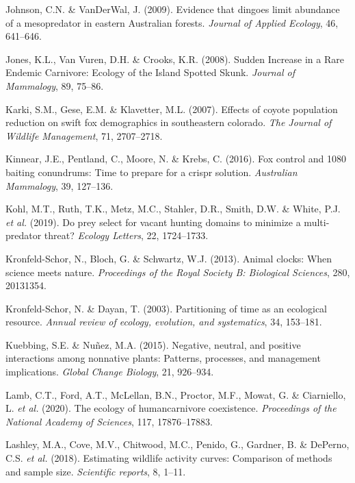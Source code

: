 \documentclass[11pt,a4paper,titlepage,twoside,openright]{style/unimelbthesis}
\begin{document}
\begin{mainmatter}
\leavevmode\hypertarget{ref-johnson2009evidence}{}%
Johnson, C.N. \& VanDerWal, J. (2009). Evidence that dingoes limit abundance of a mesopredator in eastern Australian forests. \emph{Journal of Applied Ecology}, 46, 641--646.

\leavevmode\hypertarget{ref-jones2008sudden}{}%
Jones, K.L., Van Vuren, D.H. \& Crooks, K.R. (2008). Sudden Increase in a Rare Endemic Carnivore: Ecology of the Island Spotted Skunk. \emph{Journal of Mammalogy}, 89, 75--86.

\leavevmode\hypertarget{ref-karki2007effects}{}%
Karki, S.M., Gese, E.M. \& Klavetter, M.L. (2007). Effects of coyote population reduction on swift fox demographics in southeastern colorado. \emph{The Journal of Wildlife Management}, 71, 2707--2718.

\leavevmode\hypertarget{ref-kinnear2016fox}{}%
Kinnear, J.E., Pentland, C., Moore, N. \& Krebs, C. (2016). Fox control and 1080 baiting conundrums: Time to prepare for a crispr solution. \emph{Australian Mammalogy}, 39, 127--136.

\leavevmode\hypertarget{ref-kohl2019prey}{}%
Kohl, M.T., Ruth, T.K., Metz, M.C., Stahler, D.R., Smith, D.W. \& White, P.J. \emph{et al.} (2019). Do prey select for vacant hunting domains to minimize a multi-predator threat? \emph{Ecology Letters}, 22, 1724--1733.

\leavevmode\hypertarget{ref-kronfeld2013animal}{}%
Kronfeld-Schor, N., Bloch, G. \& Schwartz, W.J. (2013). Animal clocks: When science meets nature. \emph{Proceedings of the Royal Society B: Biological Sciences}, 280, 20131354.

\leavevmode\hypertarget{ref-kronfeld2003partitioning}{}%
Kronfeld-Schor, N. \& Dayan, T. (2003). Partitioning of time as an ecological resource. \emph{Annual review of ecology, evolution, and systematics}, 34, 153--181.

\leavevmode\hypertarget{ref-kuebbing2015negative}{}%
Kuebbing, S.E. \& Nuñez, M.A. (2015). Negative, neutral, and positive interactions among nonnative plants: Patterns, processes, and management implications. \emph{Global Change Biology}, 21, 926--934.

\leavevmode\hypertarget{ref-lamb2020ecology}{}%
Lamb, C.T., Ford, A.T., McLellan, B.N., Proctor, M.F., Mowat, G. \& Ciarniello, L. \emph{et al.} (2020). The ecology of humancarnivore coexistence. \emph{Proceedings of the National Academy of Sciences}, 117, 17876--17883.

\leavevmode\hypertarget{ref-lashley2018estimating}{}%
Lashley, M.A., Cove, M.V., Chitwood, M.C., Penido, G., Gardner, B. \& DePerno, C.S. \emph{et al.} (2018). Estimating wildlife activity curves: Comparison of methods and sample size. \emph{Scientific reports}, 8, 1--11.


\end{mainmatter}
\end{document}
